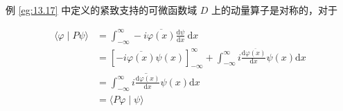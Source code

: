 \begin{eg}
    
\end{eg} 
\begin{eg}
    例 \ref{eg:13.17} 中定义的紧致支持的可微函数域 \(D\) 上的动量算子是对称的，对于

\begin{align*}
    \langle\varphi \mid P \psi\rangle&=\int_{-\infty}^{\infty}-i \overline{\varphi(x)} \frac{\mathrm{d} \psi}{\mathrm{d} x} \mathrm{~d} x\\
    &=[-i \overline{\varphi(x)} \psi(x)]_{-\infty}^{\infty}+\int_{-\infty}^{\infty} i \frac{\mathrm{d} \overline{\varphi(x)}}{\mathrm{d} x} \psi(x) \mathrm{d} x \\
&=\int_{-\infty}^{\infty} \overline{i \frac{\mathrm{d} \varphi(x)}{\mathrm{d} x}} \psi(x) \mathrm{d} x \\
&=\langle P \varphi \mid \psi\rangle
\end{align*}


\end{eg}
